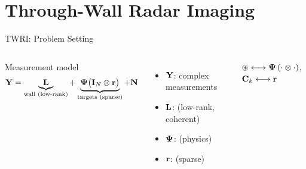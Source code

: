 
\section{Through-Wall Radar Imaging}

\begin{frame}{TWRI: Problem Setting}

  \begin{columns}[T]
      \vspace{0.3em}
  

      \vspace{0.3em}

      \begin{shibuiframe}{Measurement model}
        \[
          \Mtwri
            = \underbrace{\Mwall}_{\text{wall (low-rank)}}
            + \underbrace{%
                \Mdict\bigl(\identmat{\Mnbpos} \kron \Vtarget\bigr)%
              }_{\text{targets (sparse)}}
            + \Mnoise
        \]
      \end{shibuiframe}

      \vspace{0.5em}
      \begin{itemize}
        \item $\mathbf{Y}$: complex measurements
        \pause
        \item $\mathbf{L}$:  (low-rank, coherent)
        \pause
        \item $\boldsymbol{\Psi}$:  (physics)
        \pause
        \item $\mathbf{r}$:  (sparse)
      \end{itemize}

      \vspace{0.4em}
      \begin{shibuitip}
        $\circledast \longleftrightarrow \boldsymbol{\Psi}\,(\cdot\otimes\cdot)$,
        \quad
        $\mathbf{C}_{k} \longleftrightarrow \mathbf{r}$
      \end{shibuitip}
  \end{columns}
\end{frame}

